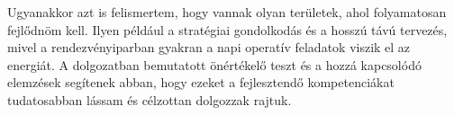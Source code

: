 Ugyanakkor azt is felismertem, hogy vannak olyan területek, ahol folyamatosan fejlődnöm kell. 
Ilyen például a stratégiai gondolkodás és a hosszú távú tervezés, mivel a rendezvényiparban gyakran a napi operatív 
feladatok viszik el az energiát. A dolgozatban bemutatott önértékelő teszt és a hozzá kapcsolódó elemzések 
segítenek abban, hogy ezeket a fejlesztendő kompetenciákat tudatosabban lássam és célzottan dolgozzak rajtuk.

